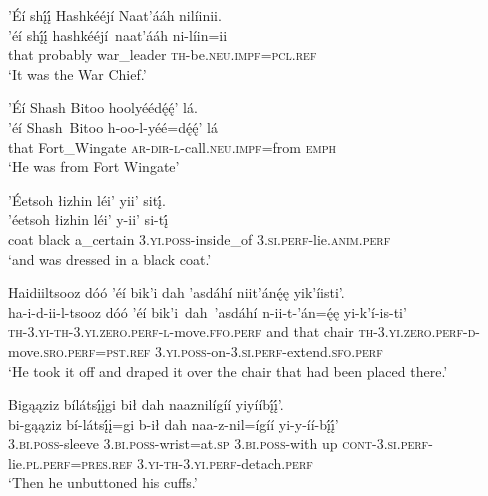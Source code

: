 \ea\label{ex:text1-66-2}
’Éí shį́į́ Hashkééjí Naat’ááh nilíinii.\\
\gll ’éí	shį́į́	hashkééjí~{naat’ááh}	ni-líin=ii\\
     that	probably	war\_leader	\textsc{th}-be.\textsc{neu}.\textsc{impf}=\textsc{pcl}.\textsc{ref}\\
\glt `It was the War Chief.'
\z

\ea\label{ex:text1-66-3}
’Éí Shash Bitoo hoolyéédę́ę́’ lá.\\
\gll ’éí	Shash~{Bitoo}	h-oo-l-yéé=dę́ę́’	lá\\
     that	Fort\_Wingate	\textsc{ar}-\textsc{dir}-\textsc{l}-call.\textsc{neu}.\textsc{impf}=from	\textsc{emph}\\
\glt `He was from Fort Wingate'
\z

\ea\label{ex:text1-66-4}
’Éetsoh łizhin léi’ yii’ sitį́.\\
\gll ’éetsoh	łizhin	léi’	y-ii’	si-tį́\\
     coat	black	a\_certain	3.\textsc{yi}.\textsc{poss}-inside\_of	3.\textsc{si}.\textsc{perf}-lie.\textsc{anim}.\textsc{perf}\\
\glt `and was dressed in a black coat.'
\z

\ea\label{ex:text1-66-5}
Haidiiltsooz dóó ’éí bik’i dah ’asdáhí niit’ánę́ę yik’íisti’.\\
\gll ha-i-d-ii-l-tsooz	dóó	’éí	bik’i~dah~{’asdáhí}	n-ii-t-’án=ę́ę	yi-k’í-is-ti’\\
     \textsc{th}-3.\textsc{yi}-\textsc{th}-3.\textsc{yi}.\textsc{zero}.\textsc{perf}-\textsc{l}-move.\textsc{ffo}.\textsc{perf}	and	that	chair	\textsc{th}-3.\textsc{yi}.\textsc{zero}.\textsc{perf}-\textsc{d}-move.\textsc{sro}.\textsc{perf}=\textsc{pst}.\textsc{ref}	3.\textsc{yi}.\textsc{poss}-on-3.\textsc{si}.\textsc{perf}-extend.\textsc{sfo}.\textsc{perf}\\
\glt `He took it off and draped it over the chair that had been placed there.'
\z

\ea\label{ex:text1-66-6}
Bigąąziz bílátsį́įgi bił dah naaznilígíí yiyííbį́į́’.\\
\gll bi-gąąziz	bí-látsį́į=gi	b-ił	dah	naa-z-nil=ígíí	yi-y-íí-bį́į́’\\
     3.\textsc{bi}.\textsc{poss}-sleeve	3.\textsc{bi}.\textsc{poss}-wrist=at.\textsc{sp}	3.\textsc{bi}.\textsc{poss}-with	up	\textsc{cont}-3.\textsc{si}.\textsc{perf}-lie.\textsc{pl}.\textsc{perf}=\textsc{pres}.\textsc{ref}	3.\textsc{yi}-\textsc{th}-3.\textsc{yi}.\textsc{perf}-detach.\textsc{perf}\\
\glt `Then he unbuttoned his cuffs.'
\z

